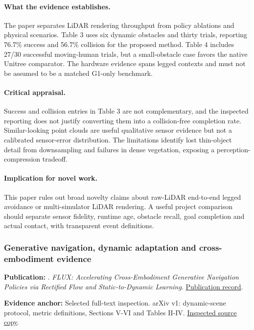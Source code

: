 \paragraph{What the evidence establishes.} The paper separates LiDAR rendering throughput from policy ablations and physical scenarios. Table 3 uses six dynamic obstacles and thirty trials, reporting 76.7\% success and 56.7\% collision for the proposed method. Table 4 includes 27/30 successful moving-human trials, but a small-obstacle case favors the native Unitree comparator. The hardware evidence spans legged contexts and must not be assumed to be a matched G1-only benchmark.

\paragraph{Critical appraisal.} Success and collision entries in Table 3 are not complementary, and the inspected reporting does not justify converting them into a collision-free completion rate. Similar-looking point clouds are useful qualitative sensor evidence but not a calibrated sensor-error distribution. The limitations identify lost thin-object detail from downsampling and failures in dense vegetation, exposing a perception-compression tradeoff.

\paragraph{Implication for novel work.} This paper rules out broad novelty claims about raw-LiDAR end-to-end legged avoidance or multi-simulator LiDAR rendering. A useful project comparison should separate sensor fidelity, runtime age, obstacle recall, goal completion and actual contact, with transparent event definitions.

\subsubsection{Generative navigation, dynamic adaptation and cross-embodiment evidence}\label{paper:flux}
\textbf{Publication:} \citet{flux}. \emph{FLUX: Accelerating Cross-Embodiment Generative Navigation Policies via Rectified Flow and Static-to-Dynamic Learning}. \href{https://arxiv.org/abs/2603.12806v1}{Publication record}.

\textbf{Evidence anchor:} Selected full-text inspection. arXiv v1: dynamic-scene protocol, metric definitions, Sections V-VI and Tables II-IV. \href{https://arxiv.org/pdf/2603.12806v1}{Inspected source copy}.

